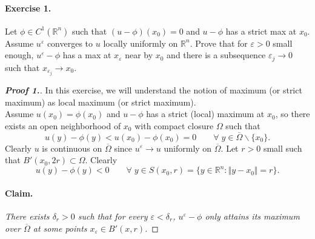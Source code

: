 \documentclass[12pt, oneside]{amsart}  	%
\begin{document}
\paragraph{\textbf{Exercise 1.}} Let $\phi\in  C^1(\mathbb{R}^n)$ such that $(u-\phi)(x_0) = 0$ and $u-\phi$ has a strict max at $x_0$. Assume $u^{\varepsilon}$ converges to $u$ locally uniformly on $\mathbb{R}^n$. Prove that for $\varepsilon>0$ small enough, $u^\varepsilon -\phi$ has a max at $x_\varepsilon$ near by $x_0$ and there is a subsequence $\varepsilon_j\longrightarrow 0$ such that $x_{\varepsilon_j}\longrightarrow x_0$.


\begin{proof}[\textbf{Proof 1.}] In this exercise, we will understand the notion of maximum (or strict maximum) as local maximum (or strict maximum).\\
Assume $u(x_0)=\phi(x_0)$ and $u - \phi$ has a strict (local) maximum at $x_0$, so there exists an open neighborhood of $x_0$ with compact closure $\Omega$ such that
\begin{equation*}
u(y) - \phi(y) < u(x_0) - \phi(x_0) = 0\qquad\forall\; y\in \overline{\Omega}\backslash \{x_0\}.
\end{equation*}
Clearly $u$ is continuous on $\overline{\Omega}$ since $u^\varepsilon\longrightarrow u$ uniformly on $\overline{\Omega}$. Let $r>0$ small such that $B'(x_0,2r)\subset \Omega$. Clearly
\begin{equation*}
u(y) - \phi(y) < 0 \qquad\forall\;y\in S(x_0,r) = \{y\in \mathbb{R}^n:\Vert y-x_0\Vert = r\}.
\end{equation*}

\paragraph{\textbf{Claim.}}\textit{ There exists $\delta_r>0$ such that for every $\varepsilon <\delta_r$, $u^{\varepsilon} - \phi$ only attains its maximum over $\overline{\Omega}$ at some points $x_\varepsilon \in B'(x,r)$.}

\end{proof}
\end{document}
